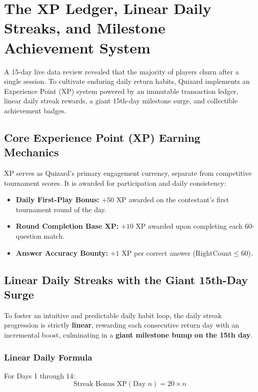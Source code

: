 \chapter{The XP Ledger, Linear Daily Streaks, and Milestone Achievement System}

\begin{tcolorbox}[storybox, title={The Retention Gamification Engine in Brief}]
A 15-day live data review revealed that the majority of players churn after a single session. To cultivate enduring daily return habits, Quizard implements an Experience Point (XP) system powered by an immutable transaction ledger, linear daily streak rewards, a giant 15th-day milestone surge, and collectible achievement badges.
\end{tcolorbox}

\section{Core Experience Point (XP) Earning Mechanics}
XP serves as Quizard's primary engagement currency, separate from competitive tournament scores. It is awarded for participation and daily consistency:

\begin{itemize}
    \item \textbf{Daily First-Play Bonus:} $+50\text{ XP}$ awarded on the contestant's first tournament round of the day.
    \item \textbf{Round Completion Base XP:} $+10\text{ XP}$ awarded upon completing each 60-question match.
    \item \textbf{Answer Accuracy Bounty:} $+1\text{ XP}$ per correct answer ($\text{RightCount} \le 60$).
\end{itemize}

\section{Linear Daily Streaks with the Giant 15th-Day Surge}
To foster an intuitive and predictable daily habit loop, the daily streak progression is strictly \textbf{linear}, rewarding each consecutive return day with an incremental boost, culminating in a \textbf{giant milestone bump on the 15th day}.

\subsection{Linear Daily Formula}
For Days 1 through 14:
\begin{equation}
\text{Streak Bonus XP}(\text{Day } n) = 20 \times n
\end{equation}

